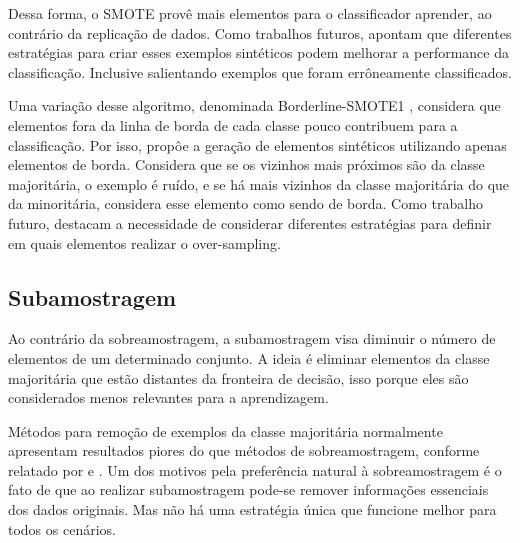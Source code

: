 Dessa forma, o SMOTE provê mais elementos para o classificador aprender, ao contrário da replicação de dados. Como trabalhos futuros,  apontam que diferentes estratégias para criar esses exemplos sintéticos podem melhorar a performance da classificação. Inclusive salientando exemplos que foram errôneamente classificados.

Uma variação desse algoritmo, denominada Borderline-SMOTE1 \cite{Han2005}, considera que elementos fora da linha de borda de cada classe pouco contribuem para a classificação. Por isso, propôe a geração de elementos sintéticos utilizando apenas elementos de borda. Considera que se os vizinhos mais próximos são da classe majoritária, o exemplo é ruído, e se há mais vizinhos da classe majoritária do que da minoritária, considera esse elemento como sendo de borda. Como trabalho futuro, destacam a necessidade de considerar diferentes estratégias para definir em quais elementos realizar o over-sampling.

\subsection{Subamostragem}

Ao contrário da sobreamostragem, a subamostragem visa diminuir o número de elementos de um determinado conjunto. A ideia é eliminar elementos da classe majoritária que estão distantes da fronteira de decisão, isso porque eles são considerados menos relevantes para a aprendizagem.

Métodos para remoção de exemplos da classe majoritária normalmente apresentam resultados piores do que métodos de sobreamostragem, conforme relatado por  e \cite{Japkowicz2002}. Um dos motivos pela preferência natural à sobreamostragem é o fato de que ao realizar subamostragem pode-se remover informações essenciais dos dados originais. Mas não há uma estratégia única que funcione melhor para todos os cenários.



